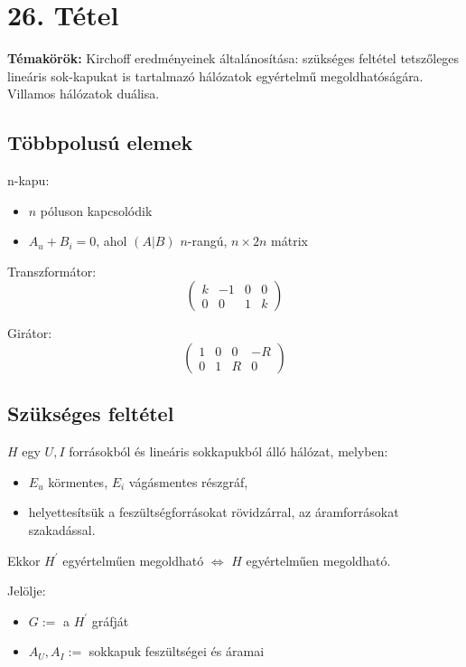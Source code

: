 
\setcounter{chapter}{26}
\chapter*{26. Tétel}

\textbf{Témakörök:} Kirchoff eredményeinek általánosítása: szükséges feltétel tetszőleges lineáris sok-kapukat is tartalmazó hálózatok egyértelmű megoldhatóságára. Villamos hálózatok duálisa.

\noindent\hrulefill

\section*{Többpolusú elemek}
n-kapu:
\begin{itemize}
\item $n$ póluson kapcsolódik
\item $A_{u}+B_{i}=0$, ahol $(A|B)$ $n$-rangú, $n\times 2n$ mátrix
\end{itemize}

\noindent
Transzformátor:
\[ \left( \begin{array}{cccc}
k & -1 & 0 & 0 \\
0 & 0 & 1 & k \end{array} \right)\] 

\noindent
Girátor:
\[ \left( \begin{array}{cccc}
1 & 0 & 0 & -R \\
0 & 1 & R & 0 \end{array} \right)\] 

\section*{Szükséges feltétel}
\begin{theo}
$H$ egy $U,I$ forrásokból és lineáris sokkapukból álló hálózat, melyben:
\begin{itemize}
\item $E_{u}$ körmentes, $E_{i}$ vágásmentes részgráf,
\item helyettesítsük a feszültségforrásokat rövidzárral, az áramforrásokat szakadással.
\end{itemize}
Ekkor $H^{'}$ egyértelműen megoldható $\Leftrightarrow$ $H$ egyértelműen megoldható.
\end{theo}

\noindent
Jelölje:
\begin{itemize}
\item $G:=$ a $H^{'}$ gráfját
\item $A_{U}, A_{I}:=$ sokkapuk feszültségei és áramai
\end{itemize}

